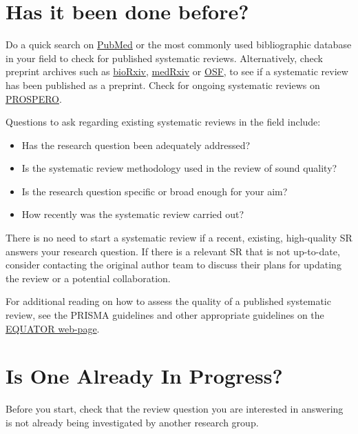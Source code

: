 \documentclass[
]{book}
\providecommand{\tightlist}{%
  \setlength{\itemsep}{0pt}\setlength{\parskip}{0pt}}
\begin{document}
\hypertarget{has-it-been-done-before}{%
\section{Has it been done before?}\label{has-it-been-done-before}}

Do a quick search on \href{https://pubmed.ncbi.nlm.nih.gov/}{PubMed} or the most commonly used bibliographic database in your field to check for published systematic reviews. Alternatively, check preprint archives such as \href{https://www.biorxiv.org/}{bioRxiv}, \href{https://www.medrxiv.org/}{medRxiv} or \href{https://osf.io/}{OSF}, to see if a systematic review has been published as a preprint. Check for ongoing systematic reviews on \href{https://www.crd.york.ac.uk/prospero/}{PROSPERO}.

Questions to ask regarding existing systematic reviews in the field include:

\begin{itemize}
\tightlist
\item
  Has the research question been adequately addressed?
\item
  Is the systematic review methodology used in the review of sound quality?
\item
  Is the research question specific or broad enough for your aim?
\item
  How recently was the systematic review carried out?
\end{itemize}

There is no need to start a systematic review if a recent, existing, high-quality SR answers your research question. If there is a relevant SR that is not up-to-date, consider contacting the original author team to discuss their plans for updating the review or a potential collaboration.

For additional reading on how to assess the quality of a published systematic review, see the PRISMA guidelines and other appropriate guidelines on the \href{https://www.equator-network.org/}{EQUATOR web-page}.

\hypertarget{is-one-already-in-progress}{%
\section{Is One Already In Progress?}\label{is-one-already-in-progress}}

Before you start, check that the review question you are interested in answering is not already being investigated by another research group.
\end{document}
